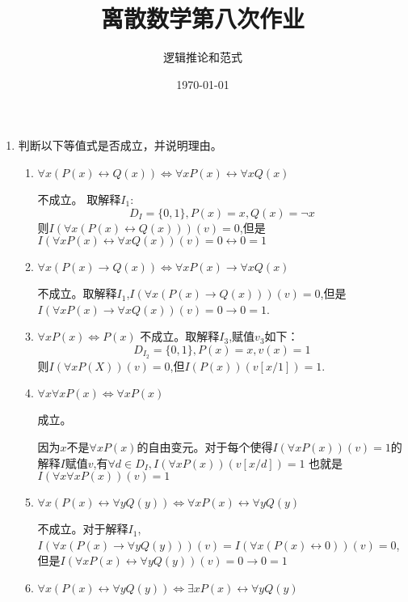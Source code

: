 \documentclass[UTF8]{ctexart}
\title{离散数学第八次作业}
\author{逻辑推论和范式}
\date{\today}
\begin{document}
    \maketitle
    \begin{enumerate}
        \item 判断以下等值式是否成立，并说明理由。
        \begin{enumerate}
            \item $\forall x(P(x) \leftrightarrow  Q(x)) \Leftrightarrow  \forall xP(x) \leftrightarrow  \forall xQ(x)$
            
            不成立。
            取解释$I_1$:
            \[
                D_I=\{0,1\},P(x)=x,Q(x)=\neg x
            \]
            则$I(\forall x(P(x)\leftrightarrow Q(x)))(v)=0$,但是$I(\forall xP(x)\leftrightarrow \forall xQ(x))(v)=0\leftrightarrow 0=1$

            \item $\forall x(P(x) \rightarrow  Q(x)) \Leftrightarrow  \forall xP(x) \rightarrow  \forall xQ(x)$
            
            不成立。取解释$I_1$,$I(\forall x(P(x)\rightarrow Q(x)))(v)=0$,但是$I(\forall xP(x)\rightarrow \forall xQ(x))(v)=0\rightarrow 0=1$.

            
            \item $\forall xP(x) \Leftrightarrow  P(x)$
            不成立。取解释$I_3$,赋值$v_3$如下：
            \[
                D_{I_2}=\{0,1\},P(x)=x,v(x)=1
            \]
            则$I(\forall xP(X))(v)=0$,但$I(P(x))(v[x/1])=1$.
            \item $\forall x\forall xP(x) \Leftrightarrow  \forall xP(x)$
            
            成立。

            因为$x$不是$\forall xP(x)$的自由变元。对于每个使得$I(\forall xP(x))(v)=1$的解释$I$赋值$v$,有$\forall d\in D_I,I(\forall xP(x))(v[x/d])=1$
            也就是$I(\forall x\forall xP(x))(v)=1$
            
            \item $\forall x(P(x) \leftrightarrow  \forall yQ(y)) \Leftrightarrow  \forall xP(x) \leftrightarrow  \forall yQ(y)$
            
            不成立。对于解释$I_1$,$I(\forall x(P(x)\rightarrow \forall yQ(y)))(v)=I(\forall x(P(x)\leftrightarrow 0))(v)=0$,但是$I(\forall xP(x)\leftrightarrow \forall yQ(y))(v)=0\rightarrow 0=1$
            
            \item $\forall x(P(x) \leftrightarrow  \forall yQ(y)) \Leftrightarrow  \exists xP(x) \leftrightarrow  \forall yQ(y)$
            

\end{enumerate}
\end{enumerate}
\end{document}
